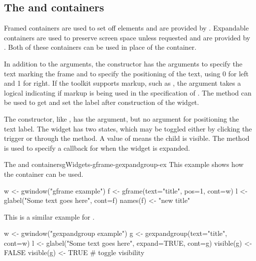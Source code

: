 \subsection{The  and  containers}
\label{sec:gWidgets-decorated-cont}

Framed containers are used to set off elements and are provided by
. Expandable containers are used to preserve
screen space unless requested and are provided by
. Both of these containers can be used in
place of the  container.

In addition to the  arguments, the 
constructor has the arguments  to specify the
text marking the frame and  to specify the
positioning of the text, using 0 for left and 1 for right. If the
toolkit supports markup, such as , the
 argument takes a logical indicating if
markup is being used in the specification of .  The
 method can be used to get and set the label
after construction of the widget.


The  constructor, like , has
the  argument, but no  argument for positioning
the text label. The widget has two states, which may be toggled either
by clicking the trigger or through the
 method.  A value of 
means the child is visible. The
 method is used to specify a
callback for when the widget is expanded.

\begin{example}{The  and  containers}{gWidgets-gframe-gexpandgroup-ex}
This example shows how the  container can be used.
\begin{Schunk}
\begin{Sinput}
 w <- gwindow("gframe example")
 f <- gframe(text="title", pos=1, cont=w)
 l <- glabel("Some text goes here", cont=f)
 names(f) <- "new title"
\end{Sinput}
\end{Schunk}

This is a similar example for .
\begin{Schunk}
\begin{Sinput}
 w <- gwindow("gexpandgroup example")
 g <- gexpandgroup(text="title", cont=w)
 l <- glabel("Some text goes here", expand=TRUE, cont=g)
 visible(g) <- FALSE
 visible(g) <- TRUE                      # toggle visibility
\end{Sinput}
\end{Schunk}
\end{example}




